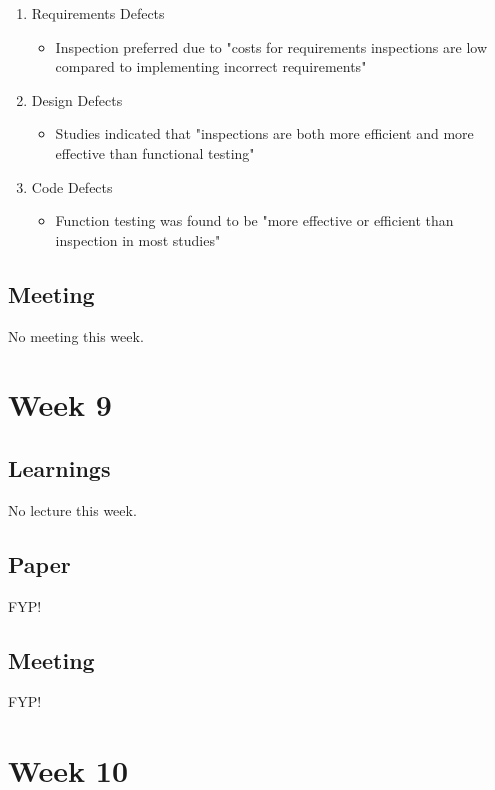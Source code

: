 \begin{enumerate}
\item Requirements Defects
\begin{itemize}
\item Inspection preferred due to "costs for requirements inspections are low compared to implementing incorrect requirements" \parencite{defect}
\end{itemize}
\item Design Defects
\begin{itemize}
\item Studies indicated that "inspections are both more efficient and more effective than functional testing" \parencite{defect}
\end{itemize}
\item Code Defects
\begin{itemize}
\item Function testing was found to be "more effective or efficient than inspection in most studies" \parencite{defect}
\end{itemize}
\end{enumerate}

\section{Meeting}

No meeting this week.

\chapter{Week 9}

\section{Learnings}

No lecture this week.

\section{Paper}

FYP!

\section{Meeting}

FYP!

\chapter{Week 10}

